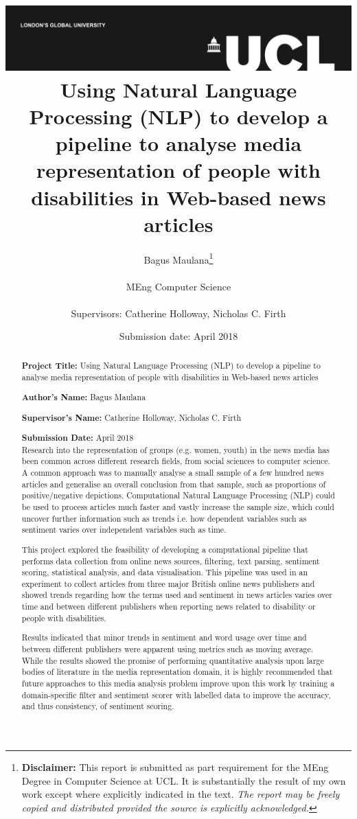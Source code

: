 \documentclass{report}
\title{{\vspace{-14em} \includegraphics[scale=0.4]{ucl_logo.png}}\\
{{\Huge Using Natural Language Processing (NLP) to develop a pipeline to analyse media representation of people with disabilities in Web-based news articles}}\\
}
\date{Submission date: \nth{30} April 2018}
\author{Bagus Maulana\thanks{
{\bf Disclaimer:}
This report is submitted as part requirement for the MEng Degree in Computer Science at UCL. It is
substantially the result of my own work except where explicitly indicated in the text.
\emph{The report may be freely copied and distributed provided the source is explicitly acknowledged.}}
\\ \\
MEng Computer Science\\ \\
Supervisors: Catherine Holloway, Nicholas C. Firth}
\begin{document}
 
\onehalfspacing
\maketitle
\begin{abstract}

\textbf{Project Title:}  Using Natural Language Processing (NLP) to develop a pipeline to analyse media representation of people with disabilities in Web-based news articles

\textbf{Author's Name:} Bagus Maulana

\textbf{Supervisor's Name:} Catherine Holloway, Nicholas C. Firth

\textbf{Submission Date:}  April 2018\\

Research into the representation of groups (e.g. women, youth) in the news media has been common across different research fields, from social sciences to computer science.
A common approach was to manually analyse a small sample of a few hundred news articles and generalise an overall conclusion from that sample, such as proportions of positive/negative depictions.
Computational Natural Language Processing (NLP) could be used to process articles much faster and vastly increase the sample size, which could uncover further information such as trends i.e. how dependent variables such as sentiment varies over independent variables such as time.

This project explored the feasibility of developing a computational pipeline that performs data collection from online news sources, filtering, text parsing, sentiment scoring, statistical analysis, and data visualisation.
This pipeline was used in an experiment to collect articles from three major British online news publishers and showed trends regarding how the terms used and sentiment in news articles varies over time and between different publishers when reporting news related to disability or people with disabilities.

Results indicated that minor trends in sentiment and word usage over time and between different publishers were apparent using metrics such as moving average.  
While the results showed the promise of performing quantitative analysis upon large bodies of literature in the media representation domain, it is highly recommended that future approaches to this media analysis problem improve upon this work by training a domain-specific filter and sentiment scorer with labelled data to improve the accuracy, and thus consistency, of sentiment scoring.

\end{abstract}
\setcounter{page}{1}
\tableofcontents
\end{document}
